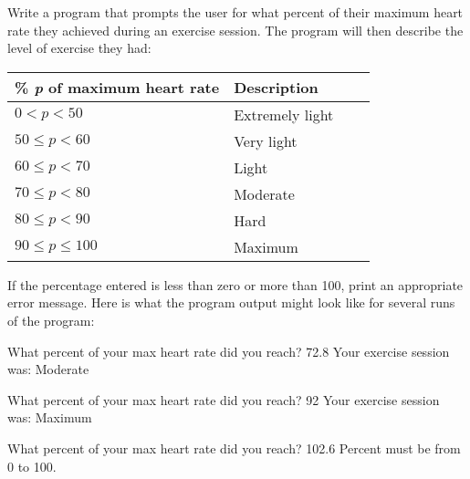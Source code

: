 \begin{exercise}
Write a program that prompts the user for what percent of their maximum heart rate they achieved during an exercise session. The program will then describe the level of exercise they had:

\begin{tabular}{|l|l|l|r|}
\hline
{\bf \% {\em p} of maximum heart rate} & {\bf Description}\\ \hline
$0 < p < 50$ & Extremely light \\ \hline
$50 \leq p < 60$ & Very light \\ \hline
$60 \leq p < 70$ & Light \\ \hline
$70 \leq p < 80$ & Moderate \\ \hline
$80 \leq p < 90$ & Hard \\ \hline
$90 \leq p \leq 100$ & Maximum \\ \hline
\end{tabular}

If the percentage entered is less than zero or more than 100, print an appropriate error message. Here is what the program output might look like for several runs of the program:

\begin{stdout}
What percent of your max heart rate did you reach? 72.8    
Your exercise session was: Moderate

What percent of your max heart rate did you reach? 92 
Your exercise session was: Maximum

What percent of your max heart rate did you reach? 102.6
Percent must be from 0 to 100.
\end{stdout}

\end{exercise}

